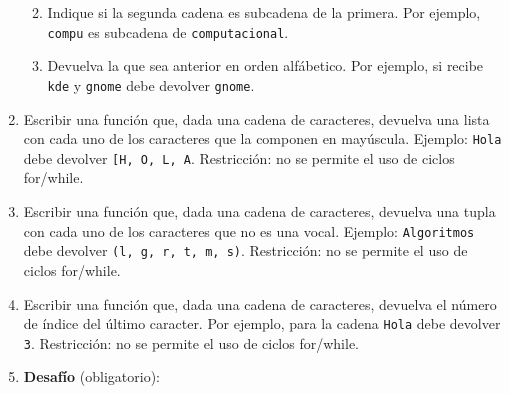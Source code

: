 \documentclass[
  letterpaper,
  DIV=11,
  numbers=noendperiod]{scrreprt}
\providecommand{\tightlist}{%
  \setlength{\itemsep}{0pt}\setlength{\parskip}{0pt}}\usepackage{longtable,booktabs,array}
\begin{document}
\begin{enumerate}
  \begin{enumerate}
  \def\labelenumii{\alph{enumii}.}
  \tightlist
  \item
    Indique si la segunda cadena es subcadena de la primera. Por
    ejemplo, \texttt{\textquotesingle{}compu\textquotesingle{}} es
    subcadena de
    \texttt{\textquotesingle{}computacional\textquotesingle{}}.
  \item
    Devuelva la que sea anterior en orden alfábetico. Por ejemplo, si
    recibe \texttt{\textquotesingle{}kde\textquotesingle{}} y
    \texttt{\textquotesingle{}gnome\textquotesingle{}} debe devolver
    \texttt{\textquotesingle{}gnome\textquotesingle{}}.
  \end{enumerate}
\item
  Escribir una función que, dada una cadena de caracteres, devuelva una
  lista con cada uno de los caracteres que la componen en mayúscula.
  Ejemplo: \texttt{\textquotesingle{}Hola\textquotesingle{}} debe
  devolver
  \texttt{{[}\textquotesingle{}H\textquotesingle{},\ \textquotesingle{}O\textquotesingle{},\ \textquotesingle{}L\textquotesingle{},\ \textquotesingle{}A\textquotesingle{}{]}}.
  Restricción: no se permite el uso de ciclos for/while.
\item
  Escribir una función que, dada una cadena de caracteres, devuelva una
  tupla con cada uno de los caracteres que no es una vocal. Ejemplo:
  \texttt{\textquotesingle{}Algoritmos\textquotesingle{}} debe devolver
  \texttt{(\textquotesingle{}l\textquotesingle{},\ \textquotesingle{}g\textquotesingle{},\ \textquotesingle{}r\textquotesingle{},\ \textquotesingle{}t\textquotesingle{},\ \textquotesingle{}m\textquotesingle{},\ \textquotesingle{}s\textquotesingle{})}.
  Restricción: no se permite el uso de ciclos for/while.
\item
  Escribir una función que, dada una cadena de caracteres, devuelva el
  número de índice del último caracter. Por ejemplo, para la cadena
  \texttt{\textquotesingle{}Hola\textquotesingle{}} debe devolver
  \texttt{3}. Restricción: no se permite el uso de ciclos for/while.
\item
  \textbf{Desafío} (obligatorio):


\end{enumerate}
\end{document}

